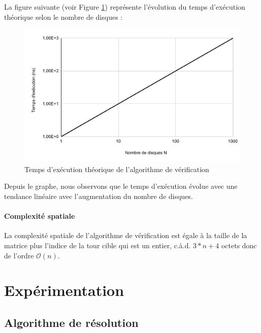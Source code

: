 La figure suivante (voir Figure \ref{fig:temps_exec_th_algo_verification}) représente l'évolution du temps d'exécution théorique selon le nombre de disques :

\begin{figure}[H]
    \centering
        \includegraphics[scale=0.6]{./ressources/temps_execution_th_algo_verification.pdf}
        \caption{Temps d'exécution théorique de l'algorithme de vérification}
    \label{fig:temps_exec_th_algo_verification}
\end{figure} 

Depuis le graphe, nous observons que le temps d'exécution évolue avec une tendance linéaire avec l'augmentation du nombre de disques.

\paragraph{Complexité spatiale}
La complexité spatiale de l'algorithme de vérification est égale à la taille de la matrice plus l'indice de la tour cible qui est un entier, c.à.d. $3 * n + 4$ octets donc de l'ordre $\mathcal{O}(n)$.


\section{Expérimentation}

\subsection{Algorithme de résolution}

